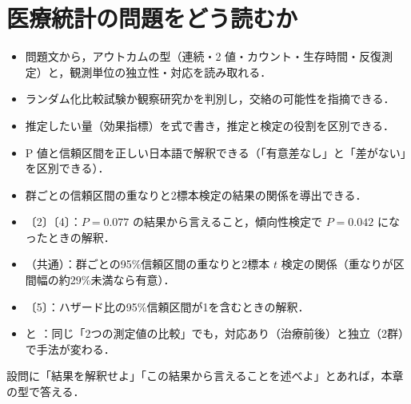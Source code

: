 \chapter{医療統計の問題をどう読むか}\label{ch:01}

\begin{goalbox}
\begin{itemize}
\item 問題文から，アウトカムの型（連続・2 値・カウント・生存時間・反復測定）と，観測単位の独立性・対応を読み取れる．
\item ランダム化比較試験か観察研究かを判別し，交絡の可能性を指摘できる．
\item 推定したい量（効果指標）を式で書き，推定と検定の役割を区別できる．
\item P 値と信頼区間を正しい日本語で解釈できる（「有意差なし」と「差がない」を区別できる）．
\item 群ごとの信頼区間の重なりと2標本検定の結果の関係を導出できる．
\end{itemize}
\end{goalbox}

\begin{exambox}
\begin{itemize}
\item {}〔2〕〔4〕：$P=0.077$ の結果から言えること，傾向性検定で $P=0.042$ になったときの解釈．
\item {}（共通）：群ごとの95\%信頼区間の重なりと2標本 $t$ 検定の関係（重なりが区間幅の約29\%未満なら有意）．
\item {}〔5〕：ハザード比の95\%信頼区間が1を含むときの解釈．
\item {} と ：同じ「2つの測定値の比較」でも，対応あり（治療前後）と独立（2群）で手法が変わる．
\end{itemize}
設問に「結果を解釈せよ」「この結果から言えることを述べよ」とあれば，本章の型で答える．
\end{exambox}

